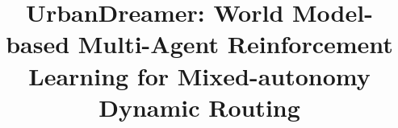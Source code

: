 \documentclass[sigconf,review]{acmart}
\begin{document}
\newcommand{\codelink}{\url{https://github.com/HongkangSu/UrbanDreamer}\xspace}

\title{UrbanDreamer: World Model-based Multi-Agent Reinforcement Learning for Mixed-autonomy Dynamic Routing}




%



\maketitle


















\newpage



\appendix


\end{document}
